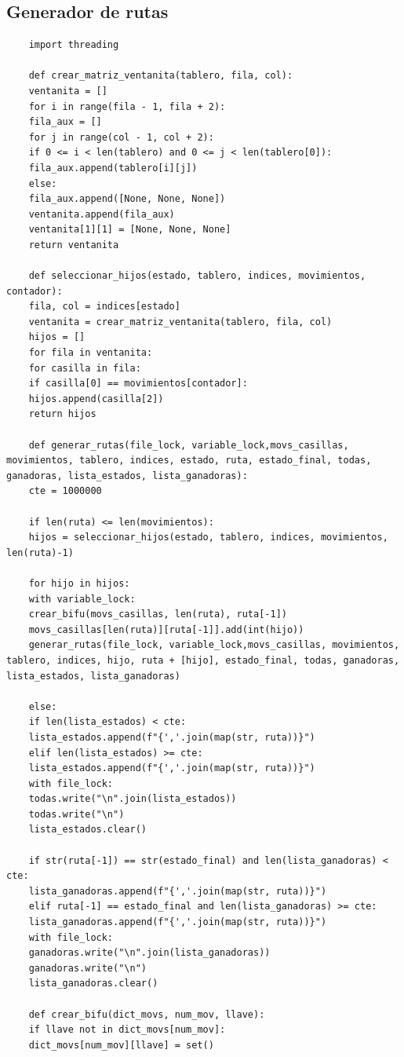 \documentclass[11pt]{article} %
\begin{document}
	\subsection{Generador de rutas}
	\begin{lstlisting}
	import threading
	
	def crear_matriz_ventanita(tablero, fila, col):
	ventanita = []
	for i in range(fila - 1, fila + 2):
	fila_aux = []
	for j in range(col - 1, col + 2):
	if 0 <= i < len(tablero) and 0 <= j < len(tablero[0]):
	fila_aux.append(tablero[i][j])
	else:
	fila_aux.append([None, None, None])
	ventanita.append(fila_aux)
	ventanita[1][1] = [None, None, None]
	return ventanita
	
	def seleccionar_hijos(estado, tablero, indices, movimientos, contador):
	fila, col = indices[estado]
	ventanita = crear_matriz_ventanita(tablero, fila, col)
	hijos = []
	for fila in ventanita:
	for casilla in fila:
	if casilla[0] == movimientos[contador]:
	hijos.append(casilla[2])
	return hijos
	
	def generar_rutas(file_lock, variable_lock,movs_casillas, movimientos, tablero, indices, estado, ruta, estado_final, todas, ganadoras, lista_estados, lista_ganadoras):
	cte = 1000000
	
	if len(ruta) <= len(movimientos):
	hijos = seleccionar_hijos(estado, tablero, indices, movimientos, len(ruta)-1)
	
	for hijo in hijos:
	with variable_lock:
	crear_bifu(movs_casillas, len(ruta), ruta[-1])
	movs_casillas[len(ruta)][ruta[-1]].add(int(hijo))
	generar_rutas(file_lock, variable_lock,movs_casillas, movimientos, tablero, indices, hijo, ruta + [hijo], estado_final, todas, ganadoras, lista_estados, lista_ganadoras)
	
	else:
	if len(lista_estados) < cte:
	lista_estados.append(f"{','.join(map(str, ruta))}")
	elif len(lista_estados) >= cte:
	lista_estados.append(f"{','.join(map(str, ruta))}")
	with file_lock:
	todas.write("\n".join(lista_estados))
	todas.write("\n")
	lista_estados.clear()
	
	if str(ruta[-1]) == str(estado_final) and len(lista_ganadoras) < cte:
	lista_ganadoras.append(f"{','.join(map(str, ruta))}")
	elif ruta[-1] == estado_final and len(lista_ganadoras) >= cte:
	lista_ganadoras.append(f"{','.join(map(str, ruta))}")
	with file_lock:
	ganadoras.write("\n".join(lista_ganadoras))
	ganadoras.write("\n")
	lista_ganadoras.clear()
	
	def crear_bifu(dict_movs, num_mov, llave):
	if llave not in dict_movs[num_mov]:
	dict_movs[num_mov][llave] = set()
	

\end{lstlisting}
\end{document}
